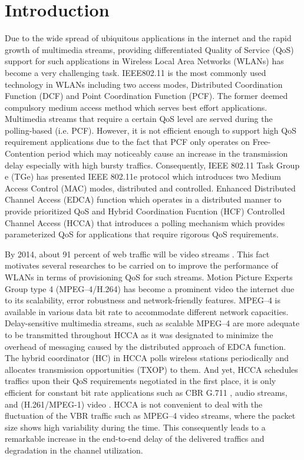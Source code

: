 \documentclass[a4paper, conference]{IEEEtran}
\begin{document}
\section{Introduction}
\label{sec:Introduction}
Due to the wide spread of ubiquitous applications in the internet and the rapid growth of multimedia streams, providing  differentiated Quality of Service (QoS) support for such applications in Wireless Local Area Networks (WLANs) has become a very challenging task. IEEE802.11 \cite{IEEEStand1999} is the most commonly used technology in WLANs including two access modes, Distributed Coordination Function (DCF) and Point Coordination Function (PCF). The former deemed compulsory medium access method which serves best effort applications. Multimedia streams that require a certain QoS level are served during the polling-based  (i.e. PCF). However, it is not efficient enough to support high QoS requirement applications due to the fact that PCF only operates on Free-Contention period which may noticeably cause an increase in the transmission delay especially with high bursty traffics. Consequently, IEEE 802.11 Task Group e (TGe) has presented IEEE 802.11e protocol \cite{IEEEStandard2007} which introduces two Medium Access Control (MAC) modes, distributed and controlled. Enhanced Distributed Channel Access (EDCA) function which operates in a distributed manner to provide prioritized QoS and Hybrid Coordination Fucntion (HCF) Controlled Channel Access (HCCA) that introduces a polling mechanism which provides parameterized QoS for applications that require rigorous QoS requirements.

By 2014, about 91 percent of web traffic will be video streams \cite{DigitalMedia2012}. This fact motivates several researches to be carried on to improve the performance of WLANs in terms of provisioning QoS for such streams. Motion Picture Experts Group type 4 (MPEG--4/H.264) has become a prominent video the internet due to its scalability, error robustness and network-friendly features. MPEG--4 is available in various data bit rate to accommodate different network capacities. Delay-sensitive multimedia streams, such as scalable MPEG--4 are more adequate to be transmitted throughout HCCA as it was designated to minimize the overhead of messaging caused by the distributed approach of EDCA function. The hybrid coordinator (HC) in HCCA polls wireless stations periodically and allocates transmission opportunities (TXOP) to them. And yet, HCCA schedules traffics upon their QoS requirements negotiated in the first place, it is only efficient for constant bit rate applications such as CBR G.711 \cite{G7111988}, audio streams, and (H.261/MPEG-1) video \cite{MPEG11997}. HCCA is not convenient to deal with the fluctuation of the VBR traffic such as MPEG--4 video streams, where the packet size shows high variability during the time. This consequently leads to a remarkable increase in the end-to-end delay of the delivered traffics and degradation in the channel utilization.
\end{document}
